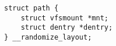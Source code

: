 
\begin{lstlisting}
struct path {
	struct vfsmount *mnt;
	struct dentry *dentry;
} __randomize_layout;
\end{lstlisting}
